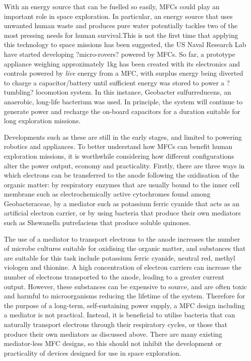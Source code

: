 \documentclass[12pt]{article}
\begin{document}
With an energy source that can be fuelled so easily, MFCs could play an important role in space exploration. In particular, an energy source that uses unwanted human waste and produces pure water potentially tackles two of the most pressing needs for human survival.This is not the first time that applying this technology to space missions has been  suggested, the US Naval Research Lab have started developing ?micro-rovers? powered by MFCs. So far, a prototype appliance weighing approximately 1kg has been created with its electronics and controls powered by \textsl{live} energy from a MFC, with surplus energy being diverted to charge a capacitor/battery until sufficient energy was stored to power a ?tumbling? locomotion system. In this instance, Geobacter sulfurreducens, an anaerobic, long-life bacterium was used. In principle, the system will continue to generate power and recharge the on-board capacitors for a duration suitable for long exploration missions.\cite{society2012microbial}


Developments such as these are still in the early stages, and limited to powering robotics and appliances. To better understand how MFCs can benefit human exploration missions, it is worthwhile considering how different configurations alter the power output, economy and practicality. Firstly, there are three ways in which electrons can be transferred to the anode following the oxidisation of the organic matter: by respiratory enzymes that are usually bound to the inner cell membrane such as electrochemically active cytochromes found among Geobacteraceae, by a mediator such as potassium ferric cyanide that acts as an artificial electron carrier, or by using bacteria that produce their own mediators such as Shewanella putrefaciens that produce soluble quinones.\cite{ghangrekar2006wastewater} \cite{min2004continuous} 


The use of a mediator to transport electrons to the anode increases the number of microbe cultures suitable for oxidising the organic matter, and substances that are suitable for this task include potassium ferric cyanide, neutral red, methyl viologen and thionine. A high concentration of electron carriers can increase the number of electrons transported to the anode, leading to a greater current output. However, these substances can be expensive to source, and are often toxic and harmful to microorganisms reducing the lifetime of the system.\cite{logan2006microbial} Therefore for the purpose of a long-term, self-sustaining power supply, a MFC design including a mediator is not practical. Instead, it is beneficial to utilise bacteria that can naturally transport electrons through their respiratory cycles, or those that produce their own mediators as discussed above. There are many existing mediator-less MFC designs, so this should not inhibit the development or practicality of devices designed for use in space exploration.\cite{min2004continuous} \cite{ghangrekar2006microbial}
\end{document}
